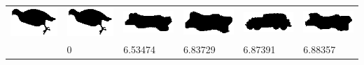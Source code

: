 \documentclass[10pt,a4paper]{article}
\begin{document}
\begin{table}
\begin{tabular}{|l|l|l|l|l|l|}
	\includegraphics[width=20mm]{queries/bird04.png} &	
	\includegraphics[width=20mm]{queries/bird04.png}  & 
	\includegraphics[width=20mm]{queries/brick08.png}  &
	\includegraphics[width=20mm]{queries/brick03.png}  &
	\includegraphics[width=20mm]{queries/classic03.png} &
	\includegraphics[width=20mm]{queries/brick04.png} \\ 
	~ & 0 & 6.53474 & 6.83729 & 6.87391 & 6.88357 \\ \hline

        \hline
    \end{tabular}
\end{table}
\end{document}
